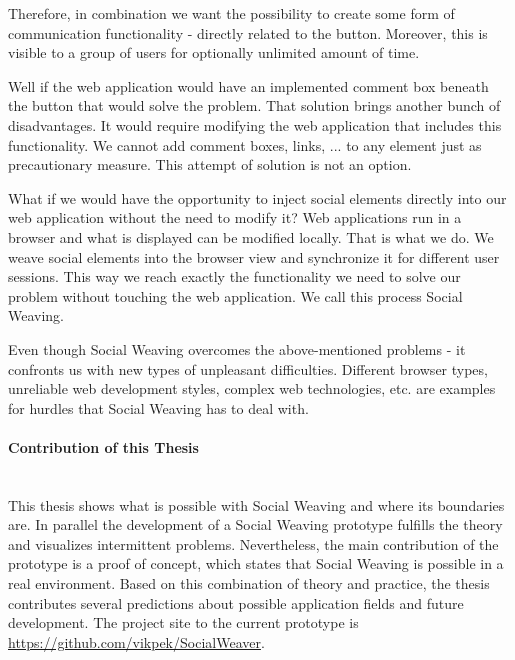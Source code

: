 Therefore, in combination we want the possibility to create some form of communication functionality - directly related to the button. Moreover, this is visible to a group of users for optionally unlimited amount of time.

Well if the web application would have an implemented comment box beneath the button that would solve the problem. That solution brings another bunch of disadvantages. It would require modifying the web application that includes this functionality. We cannot add comment boxes, links, ... to any element just as precautionary measure. This attempt of solution is not an option. 

What if we would have the opportunity to inject social elements directly into our web application without the need to modify it? Web applications run in a browser and what is displayed can be modified locally. That is what we do. We weave social elements into the browser view and synchronize it for different user sessions. This way we reach exactly the functionality we need to solve our problem without touching the web application. We call this process Social Weaving. 

Even though Social Weaving overcomes the above-mentioned problems - it confronts us with new types of unpleasant difficulties. Different browser types, unreliable web development styles, complex web technologies, etc. are examples for hurdles that Social Weaving has to deal with. 

\paragraph{Contribution of this Thesis}\mbox{}\\

This thesis shows what is possible with Social Weaving and where its boundaries are. In parallel the development of a Social Weaving prototype fulfills the theory and visualizes intermittent problems. Nevertheless, the main contribution of the prototype is a proof of concept, which states that Social Weaving is possible in a real environment. 
Based on this combination of theory and practice, the thesis contributes several predictions about possible application fields and future development. The project site to the current prototype is \url{https://github.com/vikpek/SocialWeaver}. 

